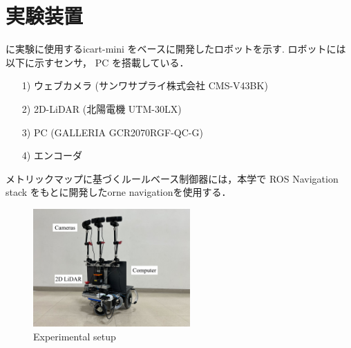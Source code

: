 \section{実験装置}
 に実験に使用するicart-mini\cite{icart} をベースに開発したロボットを示す.
ロボットには以下に示すセンサ， PC を搭載している．
\begin{enumerate}
    \item [1)] ウェブカメラ (サンワサプライ株式会社 CMS-V43BK) 
    \item [2)] 2D-LiDAR (北陽電機 UTM-30LX)
    \item [3)] PC (GALLERIA GCR2070RGF-QC-G)
    \item [4)] エンコーダ
\end{enumerate}
メトリックマップに基づくルールベース制御器には，本学で ROS Navigation stack をもとに開発したorne navigation\cite{orne_nav}を使用する．

\begin{figure}[htbp]
    \centering
     \includegraphics[width=60mm]{images/pdf/ishiguro/gamma.pdf}
     \caption{Experimental setup}
     \label{fig:gamma}
\end{figure}